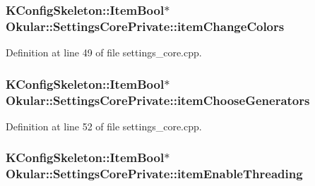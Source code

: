 \hypertarget{classOkular_1_1SettingsCorePrivate_a5254075bc2d138a58c2eb25811e18e23}{
\subsubsection[{item\+Change\+Colors}]{\setlength{\rightskip}{0pt plus 5cm}K\+Config\+Skeleton\+::\+Item\+Bool$\ast$ Okular\+::\+Settings\+Core\+Private\+::item\+Change\+Colors}}\label{classOkular_1_1SettingsCorePrivate_a5254075bc2d138a58c2eb25811e18e23}


Definition at line 49 of file settings\+\_\+core.\+cpp.

\hypertarget{classOkular_1_1SettingsCorePrivate_a92c13edf8b753540c0935dbd3d713444}{
\subsubsection[{item\+Choose\+Generators}]{\setlength{\rightskip}{0pt plus 5cm}K\+Config\+Skeleton\+::\+Item\+Bool$\ast$ Okular\+::\+Settings\+Core\+Private\+::item\+Choose\+Generators}}\label{classOkular_1_1SettingsCorePrivate_a92c13edf8b753540c0935dbd3d713444}


Definition at line 52 of file settings\+\_\+core.\+cpp.

\hypertarget{classOkular_1_1SettingsCorePrivate_a18c995e3eb7f888a24600d0346e0ef5e}{
\subsubsection[{item\+Enable\+Threading}]{\setlength{\rightskip}{0pt plus 5cm}K\+Config\+Skeleton\+::\+Item\+Bool$\ast$ Okular\+::\+Settings\+Core\+Private\+::item\+Enable\+Threading}}\label{classOkular_1_1SettingsCorePrivate_a18c995e3eb7f888a24600d0346e0ef5e}


